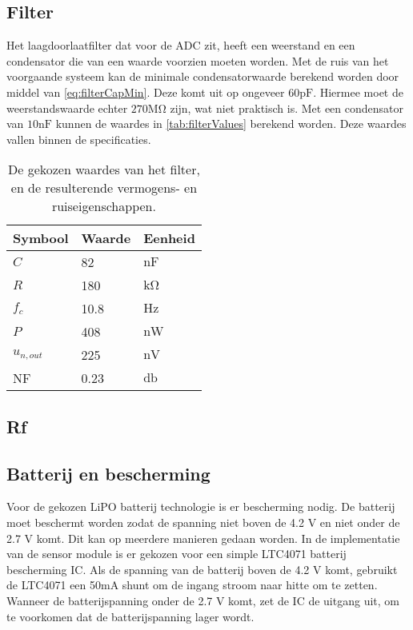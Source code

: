\subsection{Filter}
Het laagdoorlaatfilter dat voor de ADC zit, heeft een weerstand en een condensator die van een waarde voorzien moeten worden.
Met de ruis van het voorgaande systeem kan de minimale condensatorwaarde berekend worden door middel van \cref{eq:filterCapMin}. Deze komt uit op ongeveer $60\si{\pico\farad}$. Hiermee moet de weerstandswaarde echter $270\si{\mega\ohm}$ zijn, wat niet praktisch is. Met een condensator van $10\si{\nano\farad}$ kunnen de waardes in \autoref{tab:filterValues} berekend worden. Deze waardes vallen binnen de specificaties.

\begin{table}[ht]
    \centering
    \begin{tabular}{l|l|l}
        Symbool & Waarde & Eenheid \\
        \hline
        $C$         & 82    & $\si{\nano\farad}$\\
        $R$         & 180   & $\si{\kilo\ohm}$  \\
        $f_c$       & 10.8  & $\si{\hertz}$     \\
        $P$         & 408   & $\si{\nano\watt}$ \\
        $u_{n,out}$ & 225   & $\si{\nano\volt}$ \\
        NF          & 0.23  & $\si{\decibel}$   \\
    \end{tabular}
    \caption{De gekozen waardes van het filter, en de resulterende vermogens- en ruiseigenschappen.}
    \label{tab:filterValues}
\end{table}


\subsection{Rf}

\subsection{Batterij en bescherming}

Voor de gekozen LiPO batterij technologie is er bescherming nodig. De batterij moet beschermt worden zodat de spanning niet boven de 4.2 V en niet onder de 2.7 V komt. Dit kan op meerdere manieren gedaan worden. In de implementatie van de sensor module is er gekozen voor een simple LTC4071 batterij bescherming IC. Als de spanning van de batterij boven de 4.2 V komt, gebruikt de LTC4071 een 50mA shunt om de ingang stroom naar hitte om te zetten. Wanneer de batterijspanning onder de 2.7 V komt, zet de IC de uitgang uit, om te voorkomen dat de batterijspanning lager wordt.

